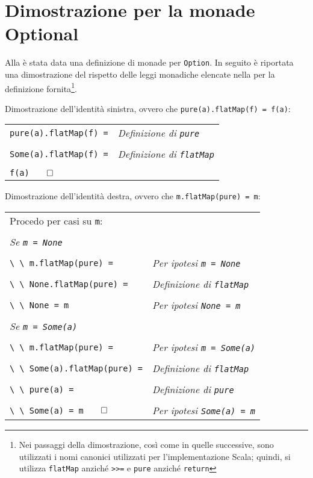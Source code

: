 \section{Dimostrazione per la monade Optional}
\label{dimostrazione-per-la-monade-optional}

Alla  è stata data una definizione di monade per \lstinline{Option}. In seguito è riportata una dimostrazione del rispetto delle leggi monadiche elencate nella  per la definizione fornita\footnote{Nei passaggi della dimostrazione, così come in quelle successive, sono utilizzati i nomi canonici utilizzati per l'implementazione Scala; quindi, si utilizza \lstinline{flatMap} anziché \lstinline{>>=} e \lstinline{pure} anziché \lstinline{return}}.

Dimostrazione dell'identità sinistra, ovvero che \lstinline{pure(a).flatMap(f) = f(a)}:

\begin{tabularx}{\textwidth}{ll}
\lstinline{pure(a).flatMap(f) =} & \emph{Definizione di \lstinline{pure}}\\
\\
\lstinline{Some(a).flatMap(f) =} & \emph{Definizione di \lstinline{flatMap}}\\
\\
\lstinline{f(a)}$\qed$ &
\end{tabularx}

Dimostrazione dell'identità destra, ovvero che \lstinline{m.flatMap(pure) = m}:

\begin{tabularx}{\textwidth}{ll}
  Procedo per casi su \lstinline{m}: & \\
  & \\
  \emph{Se \lstinline{m = None}} & \\
  \\
  \lstinline{\ \ m.flatMap(pure) =} & \emph{Per ipotesi \lstinline{m = None}}\\
  \\
  \lstinline{\ \ None.flatMap(pure) =} & \emph{Definizione di \lstinline{flatMap}}\\
  \\
  \lstinline{\ \ None = m} & \emph{Per ipotesi \lstinline{None = m}} \\
  \\
  \emph{Se \lstinline{m = Some(a)}} & \\
  \\
  \lstinline{\ \ m.flatMap(pure) =} & \emph{Per ipotesi \lstinline{m = Some(a)}}\\
  \\
  \lstinline{\ \ Some(a).flatMap(pure) =} & \emph{Definizione di \lstinline{flatMap}}\\
  \\
  \lstinline{\ \ pure(a) =} & \emph{Definizione di \lstinline{pure}}\\
  \\
  \lstinline{\ \ Some(a) = m}$\qed$ & \emph{Per ipotesi \lstinline{Some(a) = m}}
\end{tabularx}

